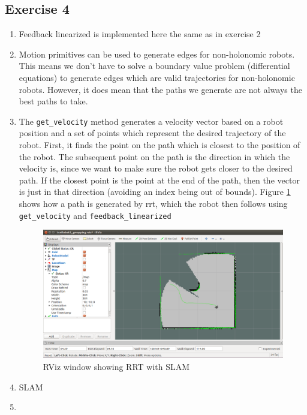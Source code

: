 \documentclass[12pt,a4paper]{article}
\begin{document}
\subsection*{Exercise 4}
\begin{enumerate}[label=(\alph*)]
	\item Feedback linearized is implemented here the same as in exercise 2
	\item Motion primitives can be used to generate edges for non-holonomic robots. This means we don't have to solve a boundary value problem (differential equations) to generate edges which are valid trajectories for non-holonomic robots. However, it does mean that the paths we generate are not always the best paths to take.
	\item The \texttt{get\_velocity} method generates a velocity vector based on a robot position and a set of points which represent the desired trajectory of the robot. First, it finds the point on the path which is closest to the position of the robot. The subsequent point on the path is the direction in which the velocity is, since we want to make sure the robot gets closer to the desired path. If the closest point is the point at the end of the path, then the vector is just in that direction (avoiding an index being out of bounds). Figure \ref{fig:rrt-slam} shows how a path is generated by rrt, which the robot then follows using \texttt{get\_velocity} and \texttt{feedback\_linearized}
	\begin{figure}[!h]
		\centering
		\includegraphics[width=\textwidth]{fig/4c.png}
		\caption{RViz window showing RRT with SLAM}
		\label{fig:rrt-slam}
	\end{figure}
	\item SLAM
	\item 
\end{enumerate}
\end{document}
